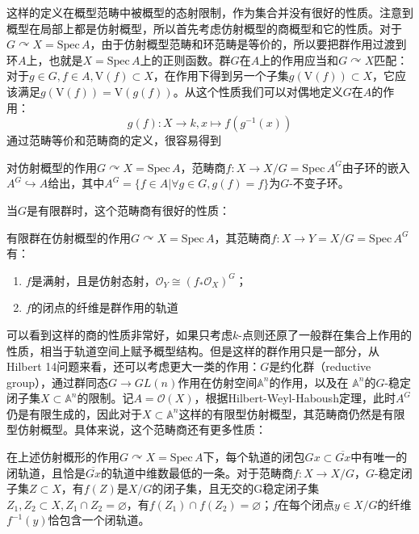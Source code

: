这样的定义在概型范畴中被概型的态射限制，作为集合并没有很好的性质。注意到概型在局部上都是仿射概型，所以首先考虑仿射概型的商概型和它的性质。对于$ G\curvearrowright X=\mathrm{Spec}\,A $，由于仿射概型范畴和环范畴是等价的，所以要把群作用过渡到环$ A $上，也就是$ X=\mathrm{Spec}\,A $上的正则函数。群$ G $在$ A $上的作用应当和$ G\curvearrowright X $匹配：对于$g\in G ,f\in A, \mathrm{V}(f) \subset X $，在作用下得到另一个子集$ g(\mathrm{V}(f))\subset X $，它应该满足$ g(\mathrm{V}(f))=\mathrm{V}(g(f)) $。从这个性质我们可以对偶地定义$ G $在$ A $的作用：
$$ g(f):X\to k,x\mapsto f(g^{-1}(x)) $$
通过范畴等价和范畴商的定义，很容易得到
\begin{proposition}
	对仿射概型的作用$ G\curvearrowright X=\mathrm{Spec}\,A $，范畴商$ f:X\to X/G=\mathrm{Spec}\,A^{G} $由子环的嵌入$ A^{G}\hookrightarrow A $给出，其中$ A^G=\{f\in A| \forall g\in G ,g(f)=f\} $为$ G $-不变子环。
\end{proposition}

当$ G $是有限群时，这个范畴商有很好的性质：
\begin{proposition}
	有限群在仿射概型的作用$ G\curvearrowright X=\mathrm{Spec}\,A $，其范畴商$ f:X\to Y=X/G=\mathrm{Spec}\,A^G $有：
	\begin{enumerate}
		\item $ f $是满射，且是仿射态射，$ \mathscr{O}_Y\cong (f_*\mathscr{O}_X)^G $；
		\item $ f $的闭点的纤维是群作用的轨道
	\end{enumerate}
\end{proposition}

可以看到这样的商的性质非常好，如果只考虑$ k $-点则还原了一般群在集合上作用的性质，相当于轨道空间上赋予概型结构。但是这样的群作用只是一部分，从Hilbert 14问题来看，还可以考虑更大一类的作用：$ G $是约化群（reductive group），通过群同态$ G\to GL(n) $作用在仿射空间$ \mathbb{A}^n $的作用，以及在 $ \mathbb{A}^n $的$ G $-稳定闭子集$ X\subset \mathbb{A}^n $的限制。记$ A=\mathscr{O}(X) $，根据Hilbert-Weyl-Haboush定理，此时$ A^G $仍是有限生成的，因此对于$ X\subset \mathbb{A}^n $这样的有限型仿射概型，其范畴商仍然是有限型仿射概型。具体来说，这个范畴商还有更多性质：
\begin{proposition}
	在上述仿射概形的作用$ G\curvearrowright X=\mathrm{Spec}\,A $下，每个轨道的闭包$ Gx\subset \overline{Gx} $中有唯一的闭轨道，且恰是$ \overline{Gx} $的轨道中维数最低的一条。对于范畴商$ f:X\to X/G $，$ G $-稳定闭子集$ Z\subset{X} $，有$ f(Z) $是$ X/G $的闭子集，且无交的G稳定闭子集$ Z_1,Z_2\subset X,Z_1\cap Z_2=\varnothing  $，有$ f(Z_1)\cap f(Z_2)=\varnothing $；$ f $在每个闭点$ y\in X/G $的纤维$ f^{-1}(y) $恰包含一个闭轨道。
\end{proposition}

